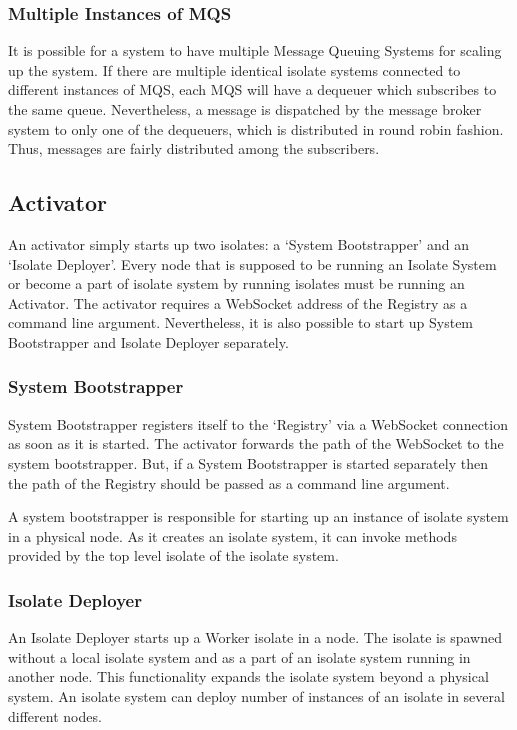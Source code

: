   \subsubsection{Multiple Instances of MQS}
  It is possible for a system to have multiple Message Queuing Systems for scaling up the system. If there are multiple identical isolate systems connected to different instances of MQS, each MQS will have a dequeuer which subscribes to the same queue. Nevertheless, a message is dispatched by the message broker system to only one of the dequeuers, which is distributed in round robin fashion. Thus, messages are fairly distributed among the subscribers.

\subsection{Activator}
  An activator simply starts up two isolates: a ‘System Bootstrapper’ and an ‘Isolate Deployer’. Every node that is supposed to be running an Isolate System or become a part of isolate system by running isolates must be running an Activator. The activator requires a WebSocket address of the Registry as a command line argument. Nevertheless, it is also possible to start up System Bootstrapper and Isolate Deployer separately.

  \subsubsection{System Bootstrapper}
  \label{subsubsec:bootstrapper}
  System Bootstrapper registers itself to the ‘Registry’ via a WebSocket connection as soon as it is started. The activator forwards the path of the WebSocket to the system bootstrapper. But, if a System Bootstrapper is started separately then the path of the Registry should be passed as a command line argument.

  A system bootstrapper is responsible for starting up an instance of isolate system in a physical node. As it creates an isolate system, it can invoke methods provided by the top level isolate of the isolate system.

  \subsubsection{Isolate Deployer}
  \label{subsubsec:isolateDeployer}
An Isolate Deployer starts up a Worker isolate in a node. The isolate is spawned without a local isolate system and as a part of an isolate system running in another node. This functionality expands the isolate system beyond a physical system. An isolate system can deploy number of instances of an isolate in several different nodes.

